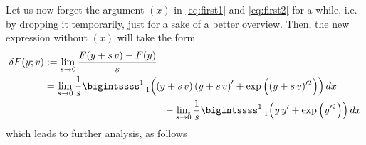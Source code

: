 \documentclass[12pt]{article}
\begin{document}
Let us now forget the argument $(x)$
in \eqref{eq:first1} and \eqref{eq:first2}
for a while, i.e. by dropping it temporarily, 
just for a sake of a better overview. 
Then, the new expression without $(x)$
will take the form
\begin{align}
	\delta F(y;v)
	 & :=  \lim_{s\to 0}\frac{F(y+s\,v)-F(y)}{s} \notag \\
	 & =  \lim_{s\to 0} \frac{1}{s}
	\bigintssss_{-1}^{1}
	\Big(
	(y+s\,v) \left(y+s\,v\right)^\prime
	+ \exp{\Big((y+s\,v)^{\prime 2}\Big)}
	\Big)\,dx \notag                                    \\
	 & \qquad\qquad\qquad\qquad\qquad\qquad
	-\lim_{s\to 0} \frac{1}{s}
	\bigintssss_{-1}^{1}
	\Big(
	y\,y' + \exp{\Big(y^{\prime 2}\Big)}
	\Big)\,dx                            
	\label{eq:first22}
\end{align}
which leads to further analysis, as follows
\end{document}
